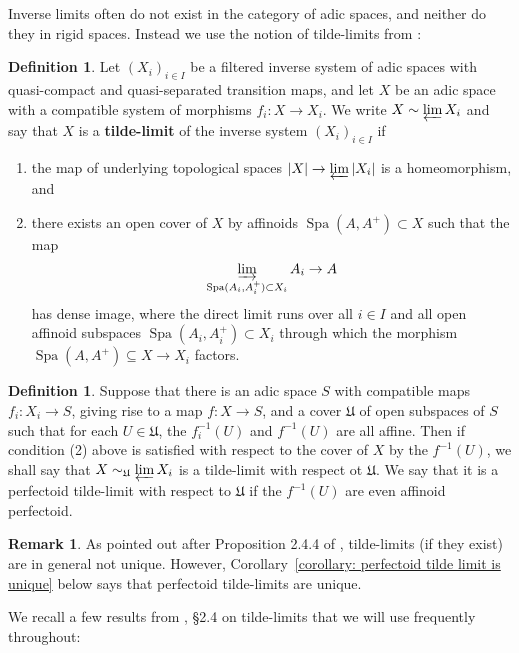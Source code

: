 \documentclass[10pt,oneside]{amsart}
\theoremstyle{definition}
\newtheorem{definition}[theorem]{Definition}
\newtheorem{remark}[theorem]{Remark}
\begin{document}
	Inverse limits often do not exist in the category of adic spaces, and neither do they in rigid spaces. Instead we use the notion of tilde-limits from \cite[Definition 2.4.2]{huber2013etale}:	
	\begin{definition} 
Let $(X_i)_{i\in I}$ be a filtered inverse system of adic spaces with quasi-compact and quasi-separated transition maps, and let $X$ be an adic space with a compatible system of morphisms $f_i\colon X \rightarrow X_i$. We write $X \sim \varprojlim X_i$ and say that $X$ is a \textbf{tilde-limit} of the inverse system $(X_i)_{i\in I}$ if 
\begin{enumerate}
	\item the map of underlying topological spaces $|X| \rightarrow \varprojlim |X_i|$ is a homeomorphism, and
	\item there exists an open cover of $X$ by affinoids $\operatorname{Spa} (A, A^+) \subset X$ such that the map 
$$ \varinjlim_{\operatorname{Spa}(A_i, A_i^+) \subset X_i} A_i \rightarrow A$$
has dense image, where the direct limit runs over all $i\in I$ and all open affinoid subspaces $\operatorname{Spa}(A_i, A_i^+) \subset X_i$ through which the morphism $\operatorname{Spa}(A, A^+) \subseteq X\rightarrow X_i$ factors.
\end{enumerate}
\end{definition}
\begin{definition}
Suppose that there is an adic space $S$ with compatible maps $f_i:X_i\to S$, giving rise to a map $f:X\to S$, and a cover $\mathfrak U$ of open subspaces of $S$ such that for each $U\in \mathfrak U$, the $f_i^{-1}(U)$ and $f^{-1}(U)$ are all affine. Then if condition (2) above is satisfied with respect to the cover of $X$ by the $f^{-1}(U)$, we shall say that $X\sim_{\mathfrak U} \varprojlim X_i$  is a tilde-limit with respect ot $\mathfrak U$. We say that it is a perfectoid tilde-limit with respect to $\mathfrak U$ if the $f^{-1}(U)$ are even affinoid perfectoid.
\end{definition}
	\begin{remark} \label{remark:tilde_limit_non_unique}
As pointed out after Proposition 2.4.4 of \cite{SW}, tilde-limits (if they exist) are in general not unique. However, Corollary~\ref{corollary: perfectoid tilde limit is unique} below says that perfectoid tilde-limits are unique.
	\end{remark}

We recall a few results from \cite{SW}, \S2.4 on tilde-limits that we will use frequently throughout:
\end{document}
